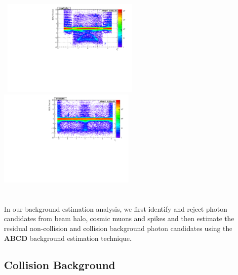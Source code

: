 \paragraph*{}\mbox{}\\
\begin{minipage}{\linewidth} 
\begin{center}
\centering
\mbox{
\includegraphics[height=0.4\textwidth, width=0.5\textwidth]{THESISPLOTS/SinglePhotonDataSet-TimeVsEta.pdf}
\includegraphics[height=0.4\textwidth, width=0.5\textwidth]{THESISPLOTS/SinglePhotonDataSet-TimeVsPhi.pdf}}
\label{fig:BKGPLOTS}
\end{center}
\end{minipage}

\paragraph*{}\mbox{}\\
 In our background estimation analysis, we first identify and reject photon candidates from beam halo, cosmic muons and spikes and then estimate the residual non-collision and collision background photon candidates  using the \textbf{\textsf{ABCD}} background estimation technique. 
\subsection{Collision Background}
